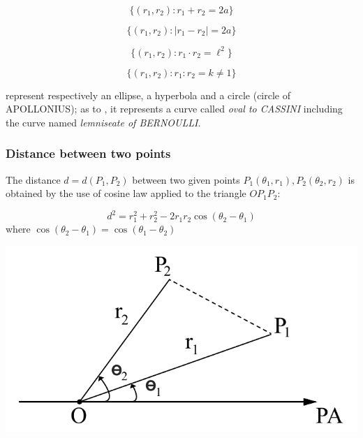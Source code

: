 \documentclass[11pt]{amsbook}
\begin{document}

\begin{multicols}{2}
	\begin{equation}
    \{(r_1, r_2): r_1 + r_2 = 2a\}
    \label{eq:b1p2_304_firstEquation}
  \end{equation}

	\begin{equation}
    \{(r_1, r_2): |r_1 - r_2| = 2a\}
    \label{eq:b1p2_304_secondEquation}
  \end{equation}
\end{multicols}
\begin{multicols}{2}
	\begin{equation}
    \{(r_1, r_2): r_1 \cdot r_2= \ell^2\}
    \label{eq:b1p2_304_thirdEquation}
  \end{equation}

	\begin{equation}
    \{(r_1, r_2): r_1 : r_2 = k \neq 1\}
    \label{eq:b1p2_304_fourthEquation}
  \end{equation}
\end{multicols}

\noindent represent respectively an ellipse, a hyperbola and a circle
(circle of APOLLONIUS); as to , it represents
a curve called \textit{oval to CASSINI} including the curve named
\textit{lemniseate of BERNOULLI}.\\

\subsubsection{Distance between two points}
\label{subsubsec:DistanceBetweenTwoPoints}

The distance $d = d(P_1, P_2)$ between two given points
$P_1(\theta_1, r_1), P_2(\theta_2, r_2)$ is obtained by the use of cosine law
applied to the triangle $O P_1 P_2$:

\begin{minipage}{0.55\textwidth}
	\[
		d^2 = r_1^2 + r_2^2 - 2 r_1 r_2 \cos(\theta_2 - \theta_1)
	\]
	where $\cos(\theta_2 - \theta_1) = \cos(\theta_1 - \theta_2)$
\end{minipage}%
\begin{minipage}{0.45\textwidth}
	\includegraphics[width=1\textwidth, keepaspectratio]{images/b1p2-304-fig01}
\end{minipage}
\end{document}
